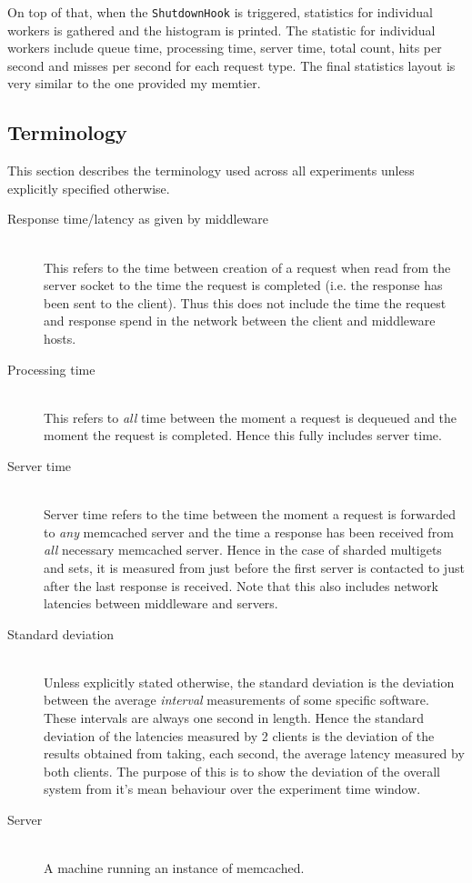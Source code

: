 \documentclass[11pt,a4paper]{article}
\begin{document}
On top of that, when the \texttt{ShutdownHook} is triggered, statistics for individual workers is gathered and the histogram is printed. The statistic for individual workers include queue time, processing time, server time, total count, hits per second and misses per second for each request type. The final statistics layout is very similar to the one provided my memtier.

\subsection{Terminology}
This section describes the terminology used across all experiments unless explicitly specified otherwise.
\begin{description}
    \item[Response time/latency as given by middleware]\hfill\\ This refers to the time between creation of a request when read from the server socket to the time the request is completed (i.e. the response has been sent to the client). Thus this does not include the time the request and response spend in the network between the client and middleware hosts.
    \item[Processing time]\hfill\\ This refers to \textit{all} time between the moment a request is dequeued and the moment the request is completed. Hence this fully includes server time.
    \item[Server time]\hfill\\ Server time refers to the time between the moment a request is forwarded to \textit{any} memcached server and the time a response has been received from \textit{all} necessary memcached server. Hence in the case of sharded multigets and sets, it is measured from just before the first server is contacted to just after the last response is received. Note that this also includes network latencies between middleware and servers.
    \item[Standard deviation]\hfill\\ Unless explicitly stated otherwise, the standard deviation is the deviation between the average \textit{interval} measurements of some specific software. These intervals are always one second in length. Hence the standard deviation of the latencies measured by 2 clients is the deviation of the results obtained from taking, each second, the average latency measured by both clients. The purpose of this is to show the deviation of the overall system from it's mean behaviour over the experiment time window.
    \item[Server]\hfill\\ A machine running an instance of memcached.
\end{description}
\end{document}
